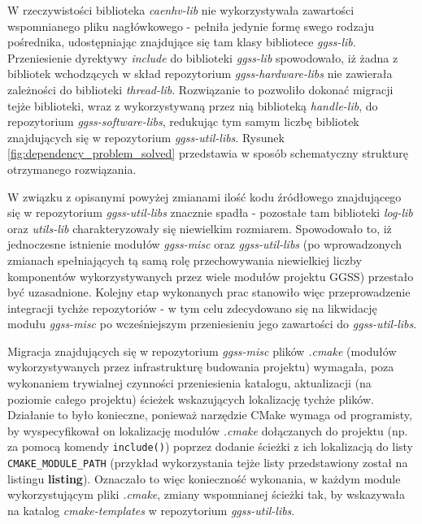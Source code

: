 W rzeczywistości biblioteka \emph{caenhv-lib} nie wykorzystywała zawartości wspomnianego pliku nagłówkowego - pełniła jedynie formę swego rodzaju pośrednika, udostępniając znajdujące się tam klasy bibliotece \emph{ggss-lib}. Przeniesienie dyrektywy \emph{include} do biblioteki \emph{ggss-lib} spowodowało, iż żadna z bibliotek wchodzących w skład repozytorium \emph{ggss-hardware-libs} nie zawierała zależności do biblioteki \emph{thread-lib}. Rozwiązanie to pozwoliło dokonać migracji tejże biblioteki, wraz z wykorzystywaną przez nią biblioteką \emph{handle-lib}, do repozytorium \emph{ggss-software-libs}, redukując tym samym liczbę bibliotek znajdujących się w repozytorium \emph{ggss-util-libs}. Rysunek \ref{fig:dependency_problem_solved} przedstawia w sposób schematyczny strukturę otrzymanego rozwiązania.

W związku z opisanymi powyżej zmianami ilość kodu źródłowego znajdującego się w repozytorium \emph{ggss-util-libs} znacznie spadła - pozostałe tam biblioteki \emph{log-lib} oraz \emph{utils-lib} charakteryzowały się niewielkim rozmiarem. Spowodowało to, iż jednoczesne istnienie modułów \emph{ggss-misc} oraz \emph{ggss-util-libs} (po wprowadzonych zmianach spełniających tą samą rolę przechowywania niewielkiej liczby komponentów wykorzystywanych przez wiele modułów projektu GGSS) przestało być uzasadnione. Kolejny etap wykonanych prac stanowiło więc przeprowadzenie integracji tychże repozytoriów - w tym celu zdecydowano się na likwidację modułu \emph{ggss-misc} po wcześniejszym przeniesieniu jego zawartości do \emph{ggss-util-libs}.

Migracja znajdujących się w repozytorium \emph{ggss-misc} plików \emph{.cmake} (modułów wykorzystywanych przez infrastrukturę budowania projektu) wymagała, poza wykonaniem trywialnej czynności przeniesienia katalogu, aktualizacji (na poziomie całego projektu) ścieżek wskazujących lokalizację tychże plików. Działanie to było konieczne, ponieważ narzędzie CMake wymaga od programisty, by wyspecyfikował on lokalizację modułów \emph{.cmake} dołączanych do projektu (np. za pomocą komendy \lstinline{include()}) poprzez dodanie ścieżki z ich lokalizacją do listy \lstinline{CMAKE_MODULE_PATH} (przykład wykorzystania tejże listy przedstawiony został na listingu \textbf{listing}). Oznaczało to więc konieczność wykonania, w każdym module wykorzystującym pliki \emph{.cmake}, zmiany wspomnianej ścieżki tak, by wskazywała na katalog \emph{cmake-templates} w repozytorium \emph{ggss-util-libs}.


